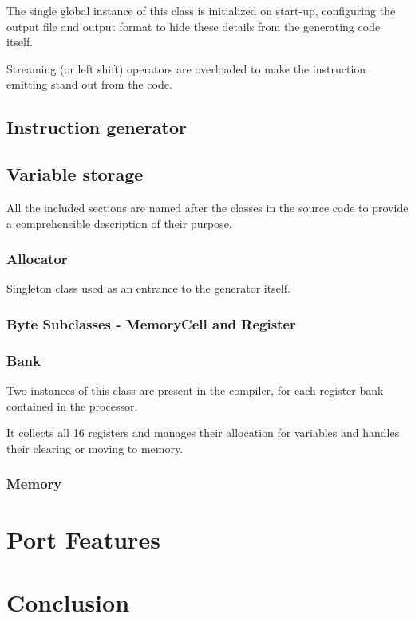     The single global instance of this class is initialized on start-up, configuring the output file and output format to hide these details from the generating code itself.

    Streaming (or left shift) operators are overloaded to make the instruction emitting stand out from the code.

\section{Instruction generator}

\section{Variable storage}

All the included sections are named after the classes in the source code to provide a comprehensible description of their purpose.

    \subsection{Allocator}

    Singleton class used as an entrance to the generator itself.

    \subsection{Byte Subclasses - MemoryCell and Register}

    \subsection{Bank}

    Two instances of this class are present in the compiler, for each register bank contained in the processor.

    It collects all 16 registers and manages their allocation for variables and handles their clearing or moving to memory.

    \subsection{Memory}

\chapter{Port Features}\label{features}

\chapter{Conclusion}\label{conclusion}


\cite{TBD}
